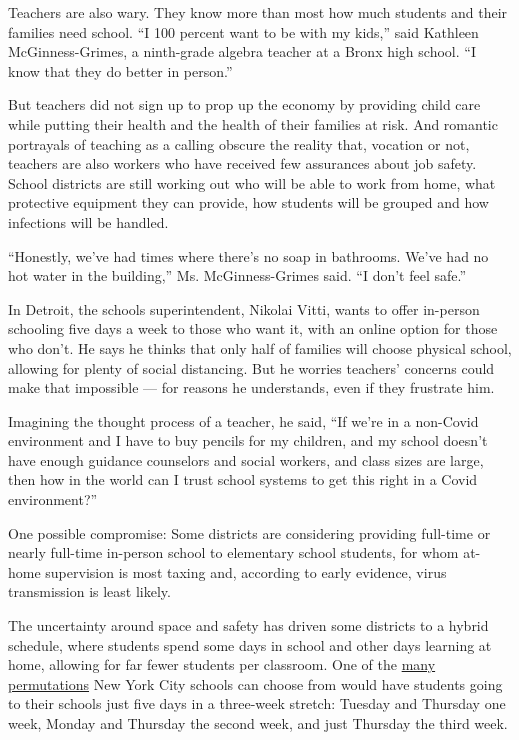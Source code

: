 Teachers are also wary. They know more than most how much students and
their families need school. ``I 100 percent want to be with my kids,''
said Kathleen McGinness-Grimes, a ninth-grade algebra teacher at a Bronx
high school. ``I know that they do better in person.''

But teachers did not sign up to prop up the economy by providing child
care while putting their health and the health of their families at
risk. And romantic portrayals of teaching as a calling obscure the
reality that, vocation or not, teachers are also workers who have
received few assurances about job safety. School districts are still
working out who will be able to work from home, what protective
equipment they can provide, how students will be grouped and how
infections will be handled.

``Honestly, we've had times where there's no soap in bathrooms. We've
had no hot water in the building,'' Ms. McGinness-Grimes said. ``I don't
feel safe.''

In Detroit, the schools superintendent, Nikolai Vitti, wants to offer
in-person schooling five days a week to those who want it, with an
online option for those who don't. He says he thinks that only half of
families will choose physical school, allowing for plenty of social
distancing. But he worries teachers' concerns could make that impossible
--- for reasons he understands, even if they frustrate him.

Imagining the thought process of a teacher, he said, ``If we're in a
non-Covid environment and I have to buy pencils for my children, and my
school doesn't have enough guidance counselors and social workers, and
class sizes are large, then how in the world can I trust school systems
to get this right in a Covid environment?''

One possible compromise: Some districts are considering providing
full-time or nearly full-time in-person school to elementary school
students, for whom at-home supervision is most taxing and, according to
early evidence, virus transmission is least likely.

The uncertainty around space and safety has driven some districts to a
hybrid schedule, where students spend some days in school and other days
learning at home, allowing for far fewer students per classroom. One of
the
\href{https://ny.chalkbeat.org/2020/7/8/21317948/nyc-school-schedule-options}{many
permutations} New York City schools can choose from would have students
going to their schools just five days in a three-week stretch: Tuesday
and Thursday one week, Monday and Thursday the second week, and just
Thursday the third week.

